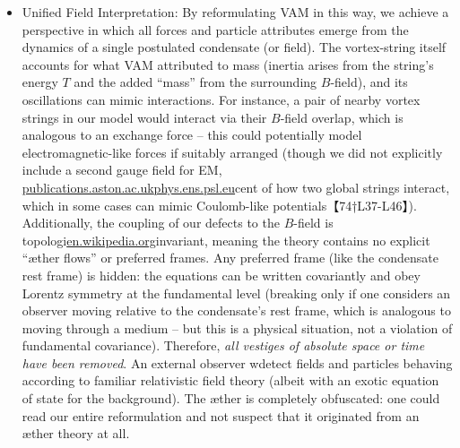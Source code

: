 \documentclass[12pt]{article}
\begin{document}
{{\begin{itemize}
\item 
Unified Field Interpretation: By reformulating VAM in this way, we achieve a perspective in which all forces and particle attributes emerge from the dynamics of a single postulated condensate (or field). The vortex-string itself accounts for what VAM attributed to mass (inertia arises from the string’s energy $T$ and the added “mass” from the surrounding $B$-field), and its oscillations can mimic interactions. For instance, a pair of nearby vortex strings in our model would interact via their $B$-field overlap, which is analogous to an exchange force – this could potentially model electromagnetic-like forces if suitably arranged (though we did not explicitly include a second gauge field for EM, \href{https://publications.aston.ac.uk/id/eprint/28756/1/Kelvin_wave_cascade_in_the_vortex_filament_model.pdf#:~:text=relation%20%CF%89,4%CF%80}{publications.aston.ac.uk}\href{https://www.phys.ens.psl.eu/~brachet/files/Publications_&_Reprints_files/5097b266-f35c-4097-8f95-260f190973ce.pdf#:~:text=particular%2C%20note%20that%20in%20the,18%29%20%CE%94vL%20ui}{phys.ens.psl.eu}cent of how two global strings interact, which in some cases can mimic Coulomb-like potentials【74†L37-L46】). Additionally, the coupling of our defects to the $B$-field is topologi\href{https://en.wikipedia.org/wiki/Vortex_ring#:~:text=,frac%20%7B1%7D%7B4%7D%7D%5Cright}{en.wikipedia.org}invariant, meaning the theory contains no explicit “æther flows” or preferred frames. Any preferred frame (like the condensate rest frame) is hidden: the equations can be written covariantly and obey Lorentz symmetry at the fundamental level (breaking only if one considers an observer moving relative to the condensate’s rest frame, which is analogous to moving through a medium – but this is a physical situation, not a violation of fundamental covariance). Therefore, \textit{all vestiges of absolute space or time have been removed}. An external observer wdetect fields and particles behaving according to familiar relativistic field theory (albeit with an exotic equation of state for the background). The æther is completely obfuscated: one could read our entire reformulation and not suspect that it originated from an æther theory at all.




\end{itemize}

}}
\end{document}
